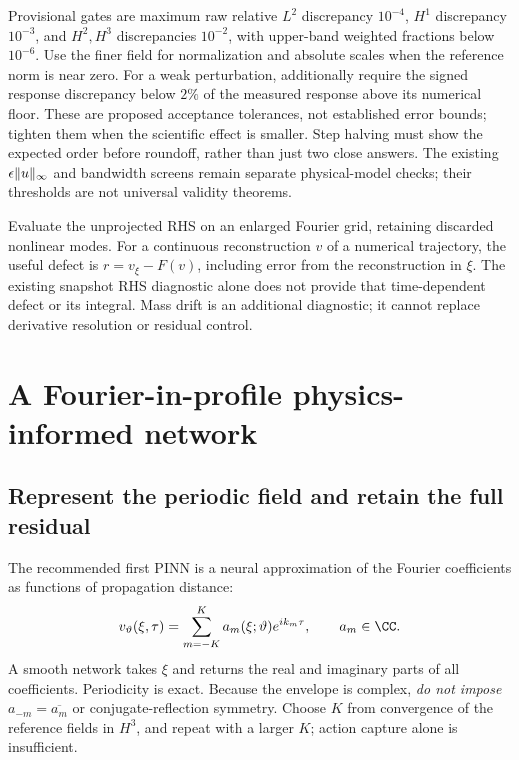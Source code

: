 Provisional gates are maximum raw relative $L^2$ discrepancy $10^{-4}$,
$H^1$ discrepancy $10^{-3}$, and $H^2,H^3$ discrepancies $10^{-2}$, with
upper-band weighted fractions below $10^{-6}$.  Use the finer field for
normalization and absolute scales when the reference norm is near zero.
For a weak perturbation, additionally require the signed response
discrepancy below $2\%$ of the measured response above its numerical floor.
These are proposed acceptance tolerances, not established error bounds;
tighten them when the scientific effect is smaller.  Step halving must show
the expected order before roundoff, rather than just two close answers.
The existing $\epsilon\lVert u\rVert_\infty$ and bandwidth screens remain
separate physical-model checks; their thresholds are not universal validity
theorems.

Evaluate the unprojected RHS on an enlarged Fourier grid, retaining discarded
nonlinear modes.  For a continuous reconstruction $v$ of a numerical
trajectory, the useful defect is $r=v_\xi-F(v)$, including error from the
reconstruction in $\xi$.  The existing snapshot RHS diagnostic alone does
not provide that time-dependent defect or its integral.  Mass drift is an
additional diagnostic; it cannot replace derivative resolution or residual
control.

\section{A Fourier-in-profile physics-informed network}
\label{sec:spectral-pinn}

\subsection{Represent the periodic field and retain the full residual}

The recommended first PINN is a neural approximation of the Fourier
coefficients as functions of propagation distance:
\begin{equation}\label{eq:spectral-pinn}
 v_\vartheta(\xi,\tau)
 =\sum_{m=-K}^{K}a_m(\xi;\vartheta)e^{ik_m\tau},
 \qquad a_m\in\CC.
\end{equation}
A smooth network takes $\xi$ and returns the real and imaginary parts of
all coefficients.  Periodicity is exact.  Because the envelope is complex,
\emph{do not impose} $a_{-m}=\overline{a_m}$ or conjugate-reflection symmetry.
Choose $K$ from convergence of the reference fields in $H^3$, and repeat
with a larger $K$; action capture alone is insufficient.

